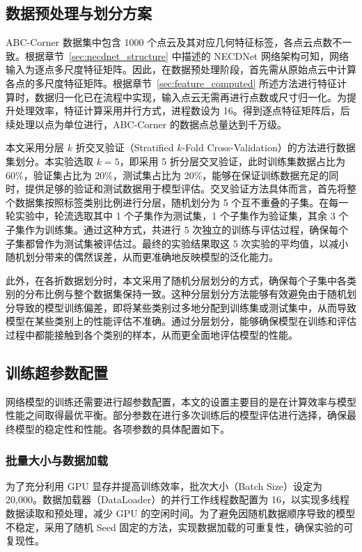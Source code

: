 \subsection{数据预处理与划分方案}
\label{subsec:data_preprocessing}

ABC-Corner 数据集中包含 1000 个点云及其对应几何特征标签，各点云点数不一致。根据章节~\ref{sec:necdnet_structure} 中描述的 NECDNet 网络架构可知，网络输入为逐点多尺度特征矩阵。因此，在数据预处理阶段，首先需从原始点云中计算各点的多尺度特征矩阵。根据章节~\ref{sec:feature_computed} 所述方法进行特征计算时，数据归一化已在流程中实现，输入点云无需再进行点数或尺寸归一化。为提升处理效率，特征计算采用并行方式，进程数设为 16。得到逐点特征矩阵后，后续处理以点为单位进行，ABC-Corner 的数据点总量达到千万级。

本文采用分层 $k$ 折交叉验证（Stratified $k$-Fold Cross-Validation）的方法进行数据集划分。本实验选取 $k=5$，即采用 5 折分层交叉验证，此时训练集数据占比为 60\%，验证集占比为 20\%，测试集占比为 20\%，能够在保证训练数据充足的同时，提供足够的验证和测试数据用于模型评估。交叉验证方法具体而言，首先将整个数据集按照标签类别比例进行分层，随机划分为 5 个互不重叠的子集。在每一轮实验中，轮流选取其中 1 个子集作为测试集，1 个子集作为验证集，其余 3 个子集作为训练集。通过这种方式，共进行 5 次独立的训练与评估过程，确保每个子集都曾作为测试集被评估过。最终的实验结果取这 5 次实验的平均值，以减小随机划分带来的偶然误差，从而更准确地反映模型的泛化能力。

此外，在各折数据划分时，本文采用了随机分层划分的方式，确保每个子集中各类别的分布比例与整个数据集保持一致。这种分层划分方法能够有效避免由于随机划分导致的模型训练偏差，即将某些类别过多地分配到训练集或测试集中，从而导致模型在某些类别上的性能评估不准确。通过分层划分，能够确保模型在训练和评估过程中都能接触到各个类别的样本，从而更全面地评估模型的性能。

\subsection{训练超参数配置}
\label{subsec:hyperparameter_configuration}

网络模型的训练还需要进行超参数配置，本文的设置主要目的是在计算效率与模型性能之间取得最优平衡。部分参数在进行多次训练后的模型评估进行选择，确保最终模型的稳定性和性能。各项参数的具体配置如下。

\subsubsection{批量大小与数据加载}
为了充分利用 GPU 显存并提高训练效率，批次大小（Batch Size）设定为 20,000。数据加载器（DataLoader）的并行工作线程数配置为 16，以实现多线程数据读取和预处理，减少 GPU 的空闲时间。为了避免因随机数据顺序导致的模型不稳定，采用了随机 Seed 固定的方法，实现数据加载的可重复性，确保实验的可复现性。

